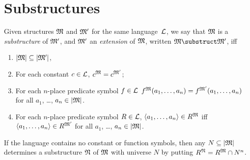 \documentclass[open-logic-section]{subfiles}
\begin{document}
\section{Substructures}

\begin{defn}
Given structures $\mathfrak M$ and $\mathfrak M'$ for the same language~$\mathcal L$,
we say that $\mathfrak M$ is a \emph{substructure} of $\mathfrak M'$, and
$\mathfrak M'$ an \emph{extension} of $\mathfrak M$, written $\Struct M
\substruct \Struct M'$, iff
\begin{enumerate}
\item $\left| \mathfrak M \right| \subseteq \left| \mathfrak M' \right|$,
\item For each constant $c \in \mathcal L$, $c^{\mathfrak M} =
    c^{\mathfrak M'}$;
\item For each $n$-place predicate symbol $f \in \mathcal L$
  $f^{\mathfrak M}(a_1, \dots, a_n) = f^{\mathfrak M'}(a_1, \dots, a_n)$
  for all $a_1$, \dots, $a_n \in \left| \mathfrak M \right|$.
\item For each $n$-place predicate symbol $R \in \mathcal L$, $\langle
  a_1, \dots, a_n\rangle \in R^{\mathfrak M}$ iff $\langle a_1, \dots,
  a_n\rangle \in R^{\mathfrak M'}$ for all $a_1$, \dots, $a_n \in
  \left| \mathfrak M \right|$.
\end{enumerate}
\end{defn}

\begin{rem}\label{remark:substructure}
If the language contains no constant or function symbols, then any $N
\subseteq \left| \mathfrak M \right|$ determines a substructure $\mathfrak N$ of
$\mathfrak M$ with universe $N$ by putting $R^{\mathfrak N} =
R^{\mathfrak M} \cap N^n$.
\end{rem}

\end{document}
